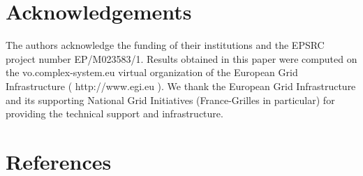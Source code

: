\documentclass[11pt]{article}
\begin{document}
\section{Acknowledgements}

The authors acknowledge the funding of their institutions and the EPSRC project number EP/M023583/1. Results obtained in this paper were computed on the vo.complex-system.eu virtual organization of the European Grid Infrastructure ( http://www.egi.eu ). We thank the European Grid Infrastructure and its supporting National Grid Initiatives (France-Grilles in particular) for providing the technical support and infrastructure.

\section{References}



\end{document}
